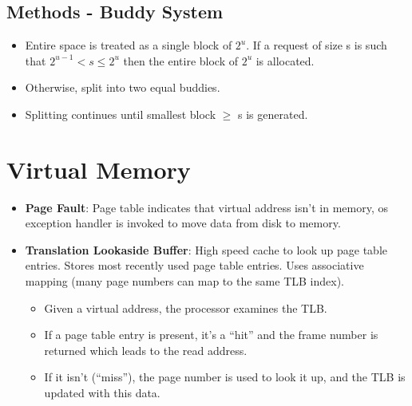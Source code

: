 \documentclass[fontsize=5pt]{scrartcl}
\begin{document}
\begin{multicols}{3}
\begin{itemize}
        \subsection{Methods - Buddy System}
        \begin{itemize}
          \item Entire space is treated as a single block of $2^{u}$. If a request of size s is such that $2^{u-1}<s\leq2^{u}$ then
          the entire block of $2^{u}$ is allocated.
          \item Otherwise, split into two equal buddies.
          \item Splitting continues until smallest block $\geq$ s is generated.
         \end{itemize}
    \end{itemize}
    
    \section{Virtual Memory}
      \begin{itemize}
       \item \textbf{Page Fault}: Page table indicates that virtual address isn't in memory, os exception handler is invoked to move data from disk to memory.
       \item \textbf{Translation Lookaside Buffer}: High speed cache to look up page table entries. Stores most recently used page table entries. Uses associative mapping (many page
              numbers can map to the same TLB index).
       \begin{itemize}
          \item Given a virtual address, the processor examines the TLB.
          \item If a page table entry is present, it's a ``hit'' and the frame number is returned which leads to the read address.
          \item If it isn't (``miss''), the page number is used to look it up, and the TLB is updated with this data.
       \end{itemize}
      \end{itemize}

\end{multicols}
\end{document}
